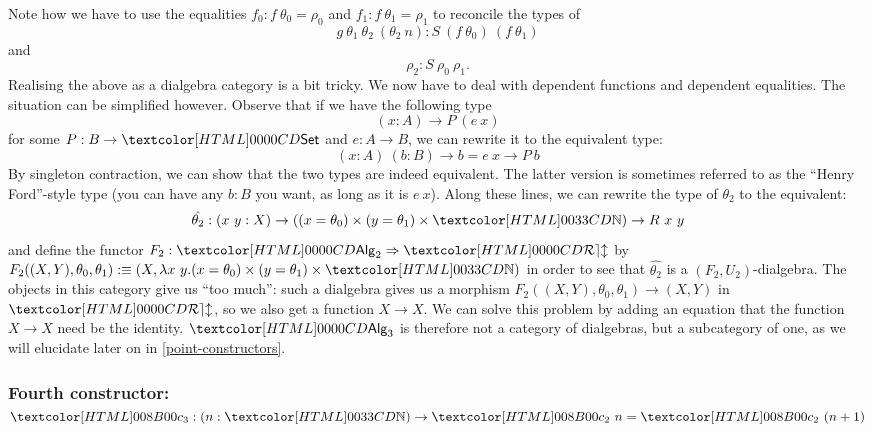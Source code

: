 Note how we have to use the equalities $f_0 : f\ \theta_0 = \rho_0$ and
$f_1 : f\ \theta_1 = \rho_1$ to reconcile the types of
$$
g\ \theta_1\ \theta_2\ (\theta_2\ n) : S\ (f\ \theta_0)\ (f\ \theta_1)
$$
and 
$$
\rho_2 : S\ \rho_0\ \rho_1 .
$$
Realising the above as a dialgebra category is a bit tricky. We now
have to deal with dependent functions and dependent equalities. The
situation can be simplified however. Observe that if we have the
following type
$$
(x : A) \to P\ (e\ x)
$$
for some $P : B \to \Set$ and $e : A \to B$, we can rewrite it to the
equivalent type:
$$
(x : A)\ (b : B) \to b = e\ x \to P\ b
$$
By singleton contraction, we can show that the two types are indeed
equivalent. The latter version is sometimes referred to as the ``Henry
Ford''-style type (you can have any $b : B$ you want, as long as it is
$e\ x$). Along these lines, we can rewrite the type of $\theta_2$ to the equivalent:
$$
\hat{\theta_2} : (x\ y : X) \to ((x = \theta_0) \times (y = \theta_1) \times \natty) \to R\ x\ y 
$$
and define the functor $F_2 : \Func{\Alg_2}{\REL}$ by
$F_2 ((X,Y),\theta_0,\theta_1) \ddefeq (X , \lambda x\ y . (x =
\theta_0) \times (y = \theta_1) \times \natty)$
in order to see that $\hat{\theta_2}$ is a $(F_2,U_2)$-dialgebra. The
objects in this category give us ``too much'': such a dialgebra gives
us a morphism $F_2((X,Y),\theta_0,\theta_1) \to (X,Y)$ in $\REL$, so
we also get a function $X \to X$. We can solve this problem by adding
an equation that the function $X \to X$ need be the identity. $\Alg_3$
is therefore not a category of dialgebras, but a subcategory of one,
as we will elucidate later on in \cref{point-constructors}.

\subsubsection{Fourth constructor: $\Bciii : (n : \natty) \to \Bcii\ n = \Bcii\ (n+1)$}

